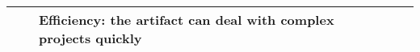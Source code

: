 \begin{longtable}[c]{@{}p{1.2cm}p{2.5cm}p{5cm}p{3cm}p{4cm}@{}}
                  &                                                & Efficiency: the artifact can deal with complex projects quickly                                                                                                                                                                                                          &                                                                                                                                                      &                                                                                                                               \\* \bottomrule
\end{longtable}